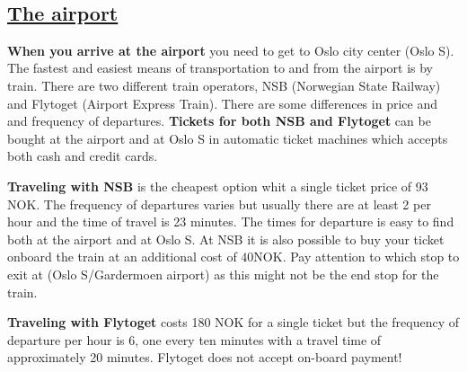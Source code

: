 \documentclass{article}
\begin{document}
\begin{center}
\begin{changemargin}{-1cm}{-1cm}
\end{changemargin}
\end{center}

\clearpage

\
\subsection*{\underline{The airport}}

\textbf{When you arrive at the airport} you need to
get to Oslo city center (Oslo S).
The fastest and easiest means of transportation to and from the airport
is by train. There are two different train operators, NSB
(Norwegian State Railway) and Flytoget (Airport Express Train).
There are some differences in price and
 and frequency of departures.
\textbf{Tickets for both NSB and Flytoget} can be bought at the airport
and at Oslo S in automatic ticket machines which accepts both cash
and credit cards.

\textbf{Traveling with NSB} is the cheapest
option whit a single ticket price
of 93 NOK. The frequency of departures varies but
usually there are at least 2 per hour and the time of travel is 23
 minutes. The times for departure is easy to find
both at the airport and at Oslo S.
At NSB it is also possible to buy your ticket
onboard the train at an additional cost of $40$NOK.
Pay attention to which stop to exit at (Oslo S/Gardermoen airport)
as this might not be the end stop for the train.

\textbf{Traveling with Flytoget} costs 180 NOK for a single ticket
but the frequency of departure per hour is 6, one every
ten minutes with a travel time of approximately 20 minutes.
Flytoget does not accept on-board payment!
\end{document}
